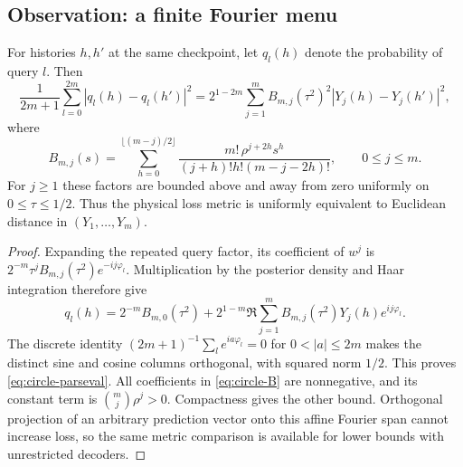\subsection{Observation: a finite Fourier menu}
\begin{lemma}\label{lem:circle-query-metric}
For histories $h,h'$ at the same checkpoint, let $q_l(h)$ denote the
probability of query $l$. Then
\begin{equation}\label{eq:circle-parseval}
 \frac1{2m+1}\sum_{l=0}^{2m}|q_l(h)-q_l(h')|^2
 =2^{1-2m}\sum_{j=1}^{m} B_{m,j}(\tau^2)^2
                       |Y_j(h)-Y_j(h')|^2,
\end{equation}
where
\begin{equation}\label{eq:circle-B}
 B_{m,j}(s)=\sum_{h=0}^{\lfloor(m-j)/2\rfloor}
 \frac{m!\,\rho^{j+2h}s^h}{(j+h)!h!(m-j-2h)!},\qquad 0\le j\le m.
\end{equation}
For $j\ge1$ these factors are bounded above and away from zero uniformly
on $0\le\tau\le1/2$. Thus the physical loss metric is uniformly
equivalent to Euclidean distance in $(Y_1,\ldots,Y_m)$.
\end{lemma}
\begin{proof}
Expanding the repeated query factor, its coefficient of $w^j$ is
$2^{-m}\tau^jB_{m,j}(\tau^2)e^{-ij\varphi_l}$. Multiplication by
the posterior density and Haar integration therefore give
\[
 q_l(h)=2^{-m}B_{m,0}(\tau^2)+
       2^{1-m}\Re\sum_{j=1}^{m}B_{m,j}(\tau^2)Y_j(h)e^{ij\varphi_l}.
\]
The discrete identity
$(2m+1)^{-1}\sum_l e^{ia\varphi_l}=0$ for
$0<|a|\le2m$ makes the distinct sine and cosine columns orthogonal,
with squared norm $1/2$. This proves \eqref{eq:circle-parseval}.
All coefficients in \eqref{eq:circle-B} are nonnegative, and its
constant term is $\binom mj\rho^j>0$. Compactness gives the other
bound. Orthogonal projection of an arbitrary prediction vector onto
this affine Fourier span cannot increase loss, so the same metric
comparison is available for lower bounds with unrestricted decoders.
\end{proof}

